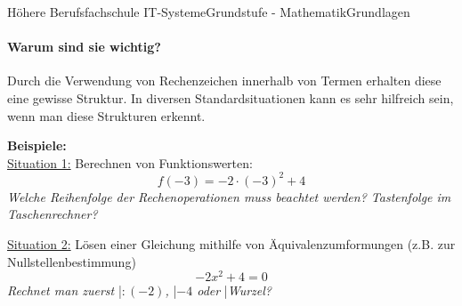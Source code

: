 \documentclass[11pt,twocolumn,oneside,openany,headings=optiontotoc,11pt,numbers=noenddot]{article}
\begin{document}
\begin{worksheet}{Höhere Berufsfachschule IT-Systeme}{Grundstufe - Mathematik}{Grundlagen}
		\paragraph{Warum sind sie wichtig?}
		Durch die Verwendung von Rechenzeichen innerhalb von Termen erhalten diese eine gewisse Struktur. In diversen Standardsituationen kann es sehr hilfreich sein, wenn man diese Strukturen erkennt.
		\begin{framed}
			\noindent
			\textbf{Beispiele:}\\
			\underline{Situation 1:} Berechnen von Funktionswerten:
			\[f(-3) = -2\cdot (-3)^2 + 4\]
			\textit{Welche Reihenfolge der Rechenoperationen muss beachtet werden? Tastenfolge im Taschenrechner?}\\
			\par\noindent
			\underline{Situation 2:} Lösen einer Gleichung mithilfe von Äquivalenzumformungen (z.B. zur Nullstellenbestimmung)
			\[-2x^2 +4 = 0\]
			\textit{Rechnet man zuerst }|\textit{\(:(-2)\), }|\textit{\(-4\) oder }|\textit{\glqq{}Wurzel\grqq{}?}
		\end{framed}

\end{worksheet}
\end{document}
